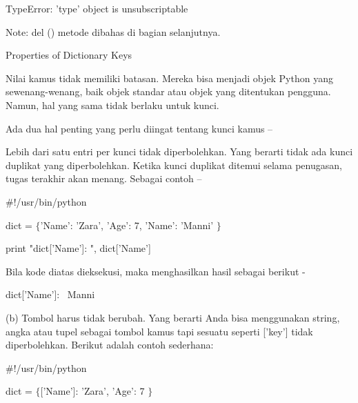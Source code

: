 \noindent 
 \hspace*{0.5in} TypeError: 'type' object is unsubscriptable \par
\noindent 
Note: del () metode dibahas di bagian selanjutnya. \par
\vspace{12pt}
\noindent 
Properties of Dictionary Keys \par
\noindent 
Nilai kamus tidak memiliki batasan. Mereka bisa menjadi objek Python yang sewenang-wenang, baik objek standar atau objek yang ditentukan pengguna. Namun, hal yang sama tidak berlaku untuk kunci. \par
\noindent 
Ada dua hal penting yang perlu diingat tentang kunci kamus – \par
\noindent 
Lebih dari satu entri per kunci tidak diperbolehkan. Yang berarti tidak ada kunci duplikat yang diperbolehkan. Ketika kunci duplikat ditemui selama penugasan, tugas terakhir akan menang. Sebagai contoh – \par
\vspace{12pt}
\noindent 
 \hspace*{0.5in}  $  \#  $!/usr/bin/python \par
\vspace{12pt}
\noindent 
 \hspace*{0.5in} dict =  $  \{  $'Name': 'Zara', 'Age': 7, 'Name': 'Manni' $  \}  $ \par
\vspace{12pt}
\noindent 
 \hspace*{0.5in} print "dict['Name']: ", dict['Name'] \par
\noindent 
Bila kode diatas dieksekusi, maka menghasilkan hasil sebagai berikut - \par
\noindent 
 \hspace*{0.5in} dict['Name']:~ Manni \par
\vspace{12pt}
\noindent 
(b) Tombol harus tidak berubah. Yang berarti Anda bisa menggunakan string, angka atau tupel sebagai tombol kamus tapi sesuatu seperti ['key'] tidak diperbolehkan. Berikut adalah contoh sederhana: \par
\vspace{12pt}
\noindent 
 \hspace*{0.5in}  $  \#  $!/usr/bin/python \par
\vspace{12pt}
\noindent 
 \hspace*{0.5in} dict =  $  \{  $['Name']: 'Zara', 'Age': 7 $  \}  $ \par
